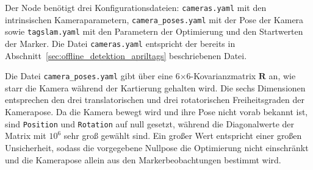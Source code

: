 Der Node benötigt drei Konfigurationsdateien: \texttt{cameras.yaml} mit den intrinsischen Kameraparametern, \texttt{camera\_poses.yaml} mit der Pose 
der Kamera sowie \texttt{tagslam.yaml} mit den Parametern der Optimierung und den Startwerten der Marker.
Die Datei \texttt{cameras.yaml} entspricht der bereits in Abschnitt~\ref{sec:offline_detektion_apriltags} beschriebenen Datei.

Die Datei \texttt{camera\_poses.yaml} gibt über eine 6$\times$6-Kovarianzmatrix $\mathbf{R}$ an, wie starr die Kamera während der Kartierung gehalten wird.
Die sechs Dimensionen entsprechen den drei translatorischen und drei rotatorischen Freiheitsgraden der Kamerapose.
Da die Kamera bewegt wird und ihre Pose nicht vorab bekannt ist, sind \texttt{Position} und \texttt{Rotation} auf null gesetzt, während die Diagonalwerte der Matrix mit 
$10^{6}$ sehr groß gewählt sind.
Ein großer Wert entspricht einer großen Unsicherheit, sodass die vorgegebene Nullpose die Optimierung nicht einschränkt 
und die Kamerapose allein aus den Markerbeobachtungen bestimmt wird.

